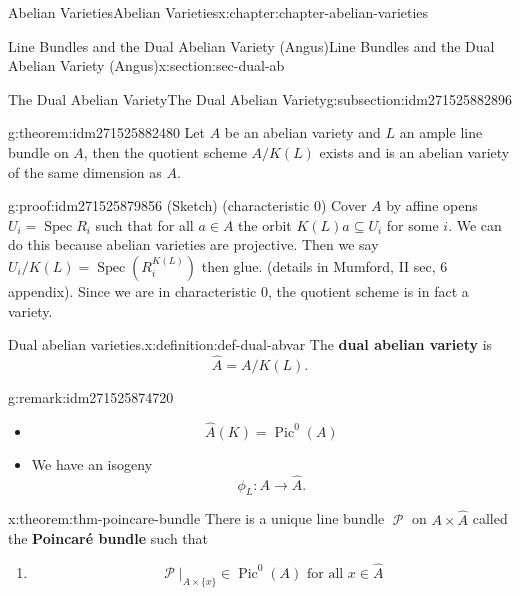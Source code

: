 \documentclass[oneside,10pt,]{book}
\newcommand{\terminology}[1]{\textbf{#1}}
\numberwithin{equation}{section}
\newcommand{\sheaf}[1]{\operatorname{\mathcal{#1}}}
\DeclareMathOperator{\Pic}{Pic}
\DeclareMathOperator{\Spec}{Spec}
\begin{document}
\begin{chapterptx}{Abelian Varieties}{}{Abelian Varieties}{}{}{x:chapter:chapter-abelian-varieties}
\begin{sectionptx}{Line Bundles and the Dual Abelian Variety (Angus)}{}{Line Bundles and the Dual Abelian Variety (Angus)}{}{}{x:section:sec-dual-ab}
\typeout{************************************************}
%
\begin{subsectionptx}{The Dual Abelian Variety}{}{The Dual Abelian Variety}{}{}{g:subsection:idm271525882896}
\begin{theorem}{}{}{g:theorem:idm271525882480}%
Let \(A\) be an abelian variety and \(L\) an ample line bundle on \(A\), then the quotient scheme \(A/K(L)\) exists and is an abelian variety of the same dimension as \(A\).%
\end{theorem}
\begin{proofptx}{}{g:proof:idm271525879856}
(Sketch) (characteristic 0) Cover \(A\) by affine opens \(U_i = \Spec R_i\) such that for all \(a \in A\) the orbit \(K(L)a \subseteq U_i\) for some \(i\). We can do this because abelian varieties are projective. Then we say \(U_i / K(L) = \Spec(R^{K(L)}_i)\) then glue. (details in Mumford, II sec, 6  appendix). Since we are in characteristic 0, the quotient scheme is in fact a variety.%
\end{proofptx}
\begin{definition}{Dual abelian varieties.}{x:definition:def-dual-abvar}%
The \terminology{dual abelian variety} is%
\begin{equation*}
\hat A = A/K(L)\text{.}
\end{equation*}
%
\end{definition}
\begin{remark}{}{g:remark:idm271525874720}%
%
\begin{itemize}[label=\textbullet]
\item{}%
\begin{equation*}
\hat A(K) = \Pic^0(A)
\end{equation*}
%
\item{}We have an isogeny%
\begin{equation*}
\phi_L\colon A \to \hat A\text{.}
\end{equation*}
%
\end{itemize}
%
\end{remark}
\begin{theorem}{}{}{x:theorem:thm-poincare-bundle}%
There is a unique line bundle \(\sheaf P\) on \(A\times \hat A\) called the \terminology{Poincaré bundle} such that%
\begin{enumerate}
\item{}%
\begin{equation*}
\sheaf P|_{A\times \{x\}} \in \Pic^0(A) \text{ for all }x\in \hat A
\end{equation*}

\end{enumerate}
\end{theorem}
\end{subsectionptx}
\end{sectionptx}
\end{chapterptx}
\end{document}
